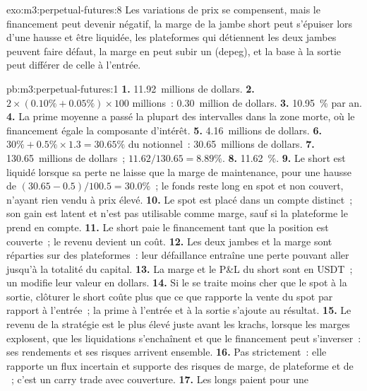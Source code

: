 \begin{solution}{exo:m3:perpetual-futures:8}
Les variations de prix se compensent, mais le financement peut devenir négatif, la marge de la jambe short peut s'épuiser lors d'une hausse et être liquidée,
les plateformes qui détiennent les deux jambes peuvent faire défaut, la marge en  peut subir un  (depeg), et la base à la sortie peut différer de celle à l'entrée.
\end{solution}

\begin{solution}{pb:m3:perpetual-futures:1}
\textbf{1.} 11.92~millions de dollars. \textbf{2.} $2 \times (0.10\% + 0.05\%) \times 100$ millions~: 0.30~million de dollars.
\textbf{3.} 10.95~\% par an. \textbf{4.} La prime moyenne a passé la plupart des intervalles dans la zone morte, où le financement
égale la composante d'intérêt. \textbf{5.} 4.16~millions de dollars. \textbf{6.} $30\% + 0.5\% \times 1.3 = 30.65\%$ du
notionnel~: 30.65~millions de dollars. \textbf{7.} 130.65~millions de dollars~; $11.62/130.65 = 8.89\%$. \textbf{8.} 11.62~\%.
\textbf{9.} Le short est liquidé lorsque sa perte ne laisse que la marge de maintenance, pour une hausse de $(30.65 -
0.5)/100.5 = 30.0\%$~; le fonds reste long en spot et non couvert, n'ayant rien vendu à prix élevé. \textbf{10.} Le spot est placé
dans un compte distinct~; son gain est latent et n'est pas utilisable comme marge, sauf si la plateforme le prend en compte.
\textbf{11.} Le short paie le financement tant que la position est couverte~; le revenu devient un coût. \textbf{12.} Les deux jambes et la marge
sont réparties sur des plateformes~: leur défaillance entraîne une perte pouvant aller jusqu'à la totalité du capital. \textbf{13.} La marge et le P\&L du short sont en
USDT~; un  modifie leur valeur en dollars. \textbf{14.} Si le  se traite moins cher que le spot à la sortie, clôturer le
short coûte plus que ce que rapporte la vente du spot par rapport à l'entrée~; la prime à l'entrée et à la sortie s'ajoute au résultat.
\textbf{15.} Le revenu de la stratégie est le plus élevé juste avant les krachs, lorsque les marges explosent, que les liquidations s'enchaînent et que le financement
peut s'inverser~: ses rendements et ses risques arrivent ensemble. \textbf{16.} Pas strictement~: elle rapporte un flux incertain et
supporte des risques de marge, de plateforme et de ~; c'est un carry trade avec couverture. \textbf{17.} Les longs paient pour une

\end{solution}
